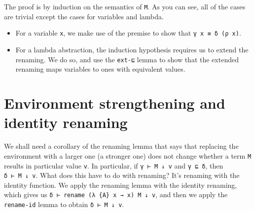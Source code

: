 \begin{fence}
\begin{code}
\AgdaSymbol{)}\<%
\\
\>[0]\AgdaSpace{}%
\AgdaSpace{}%
\AgdaSpace{}%
\AgdaSymbol{(}\AgdaSpace{}%
\AgdaSpace{}%
\AgdaSymbol{)}\AgdaSpace{}%
\AgdaSymbol{=}\<%
\\
\>[0][@{}l@{\AgdaIndent{0}}]%
\>[3]\AgdaSpace{}%
\AgdaSymbol{(}\AgdaSpace{}%
\AgdaSpace{}%
\AgdaSpace{}%
\AgdaSymbol{)}\AgdaSpace{}%
\<%
\end{code}
\end{fence}

The proof is by induction on the semantics of \texttt{M}. As you can
see, all of the cases are trivial except the cases for variables and
lambda.

\begin{itemize}
\item
  For a variable \texttt{x}, we make use of the premise to show that
  \texttt{γ\ x\ ≡\ δ\ (ρ\ x)}.
\item
  For a lambda abstraction, the induction hypothesis requires us to
  extend the renaming. We do so, and use the \texttt{ext-⊑} lemma to
  show that the extended renaming maps variables to ones with equivalent
  values.
\end{itemize}

\hypertarget{environment-strengthening-and-identity-renaming}{%
\section{Environment strengthening and identity
renaming}\label{environment-strengthening-and-identity-renaming}}

We shall need a corollary of the renaming lemma that says that replacing
the environment with a larger one (a stronger one) does not change
whether a term \texttt{M} results in particular value \texttt{v}. In
particular, if \texttt{γ\ ⊢\ M\ ↓\ v} and \texttt{γ\ ⊑\ δ}, then
\texttt{δ\ ⊢\ M\ ↓\ v}. What does this have to do with renaming? It's
renaming with the identity function. We apply the renaming lemma with
the identity renaming, which gives us
\texttt{δ\ ⊢\ rename\ (λ\ \{A\}\ x\ →\ x)\ M\ ↓\ v}, and then we apply
the \texttt{rename-id} lemma to obtain \texttt{δ\ ⊢\ M\ ↓\ v}.

